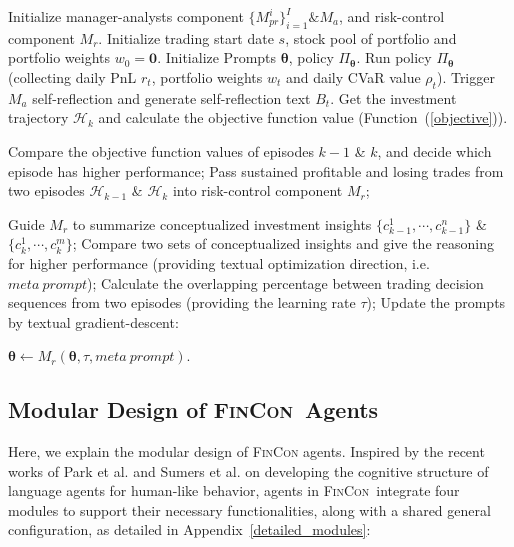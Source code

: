 \begin{algorithm}[ht]
\caption{\small Training Stage Algorithm of \textsc{FinCon}: Conceptual Verbal Reinforcement using Textual-based Gradient Descent}
\label{alg:concept_VF}
\begin{algorithmic}
\footnotesize{
\STATE Initialize manager-analysts component $\{M_{pr}^i\}^{I}_{i=1} \& M_a$, and risk-control component $M_r$.
\STATE Initialize trading start date $s$, stock pool of portfolio and portfolio weights $w_0=\textbf{0}$.
\STATE Initialize Prompts $\bm{\theta}$, policy $\Pi_{\bm{\theta}}$.
        \STATE Run policy $\Pi_{\bm{\theta}}$ (collecting daily PnL $r_t$, portfolio weights $w_t$ and daily CVaR value $\rho_t$).
            \STATE Trigger $M_a$ self-reflection and generate self-reflection text $B_t$.
        \ENDIF
        \STATE Get the investment trajectory $\mathcal{H}_k$ and calculate the objective function value (Function~(\ref{objective})).
    \ENDFOR
    
    \STATE Compare the objective function values of episodes $k-1$ \& $k$, and decide which episode has higher performance;
    \STATE Pass sustained profitable and losing trades from two episodes $\mathcal{H}_{k-1}$ \& $\mathcal{H}_k$ into risk-control component $M_r$;\par
    \STATE Guide $M_r$ to summarize conceptualized investment insights $\{c_{k-1}^1,\cdots,c_{k-1}^n\}$ \& $\{c_k^1,\cdots,c_k^m\}$;
    \STATE Compare two sets of conceptualized insights and give the reasoning for higher performance (providing textual optimization direction, i.e. $meta~prompt$);
    \STATE Calculate the overlapping percentage between trading decision sequences from two episodes (providing the learning rate $\tau$);
    \STATE Update the prompts by textual gradient-descent:
    \begin{center}
        $\bm{\theta} \longleftarrow M_r(\bm{\theta},\tau,meta~prompt).$
    \end{center}
\ENDWHILE
}
\end{algorithmic}
\end{algorithm}

\subsection{Modular Design of \textsc{FinCon}\ Agents}
Here, we explain the modular design of \textsc{FinCon} agents. Inspired by the recent works of Park et al. \cite{sumers2023cognitive} and Sumers et al. \cite{zhang2023exploring} on developing the cognitive structure of language agents for human-like behavior, agents in \textsc{FinCon}\ integrate four modules to support their necessary functionalities, along with a shared general configuration, as detailed in Appendix~\ref{detailed_modules}:

